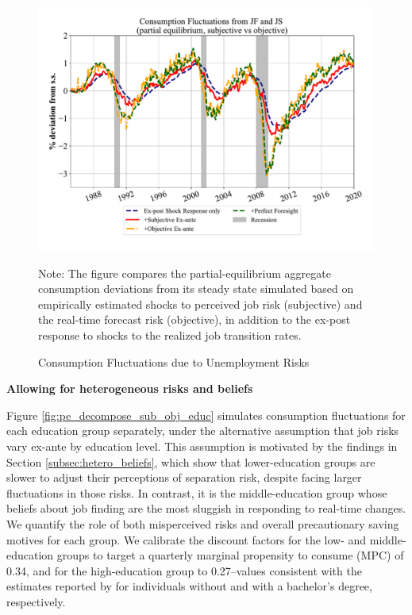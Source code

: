 \begin{figure}[ht]
    \centering
    \caption{Consumption Fluctuations due to Unemployment Risks}
        \label{fig:pe_decompose_sub_obj_combined}
\includegraphics[width=1.05\linewidth]{text/chapter2/Figures/consumption_pe_JS_JF_deviation_machine_as_rational_monthly.pdf} \\
	\begin{flushleft}\footnotesize {Note: The figure compares the partial-equilibrium aggregate consumption deviations from its steady state simulated based on empirically estimated shocks to perceived job risk (subjective) and the real-time forecast risk (objective), in addition to the ex-post response to shocks to the realized job transition rates.} \end{flushleft}
\end{figure}
\textbf{Allowing for heterogeneous risks and beliefs} 


Figure \ref{fig:pe_decompose_sub_obj_educ} simulates consumption fluctuations for each education group separately, under the alternative assumption that job risks vary ex-ante by education level. This assumption is motivated by the findings in Section \ref{subsec:hetero_beliefs}, which show that lower-education groups are slower to adjust their perceptions of separation risk, despite facing larger fluctuations in those risks. In contrast, it is the middle-education group whose beliefs about job finding are the most sluggish in responding to real-time changes. We quantify the role of both misperceived risks and overall precautionary saving motives for each group. We calibrate the discount factors for the low- and middle-education groups to target a quarterly marginal propensity to consume (MPC) of 0.34, and for the high-education group to 0.27--values consistent with the estimates reported by \cite{Fuster2020} for individuals without and with a bachelor’s degree, respectively.


